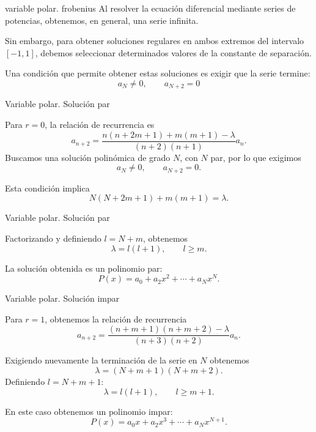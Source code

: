 \begin{frame}{variable polar. frobenius}
    Al resolver la ecuación diferencial mediante series de
    potencias, obtenemos, en general, una serie infinita.

    \vspace{0.2cm}

    Sin embargo, para obtener soluciones regulares en ambos
    extremos del intervalo $[-1,1]$, debemos seleccionar
    determinados valores de la constante de separación.

    \vspace{0.2cm}

    Una condición que permite obtener estas soluciones es
    exigir que la serie termine:
    \[
        a_N\neq 0,\qquad a_{N+2}=0
    \]
\end{frame}

\begin{frame}{Variable polar. Solución par}

    Para $r=0$, la relación de recurrencia es
	\begin{equation}
		a_{n+2}=\frac{n(n+2m+1)+m(m+1)-\lambda}{(n+2)(n+1)}a_n.
		\label{eq:recursividad de P r=0}
	\end{equation}
    Buscamos una solución polinómica de grado $N$, con
    $N$ par, por lo que exigimos
    \[
        a_N\neq 0,\qquad a_{N+2}=0.
    \]

    Esta condición implica
    \[
        N(N+2m+1)+m(m+1)=\lambda.
    \]
\end{frame}

\begin{frame}{Variable polar. Solución par}

    Factorizando y definiendo $l=N+m$, obtenemos
    \[
        \lambda=l(l+1),\qquad l\geq m.
    \]

    La solución obtenida es un polinomio par:
    \[
        P(x)=a_0+a_2x^2+\cdots+a_Nx^N.
    \]

\end{frame}
\begin{frame}{Variable polar. Solución impar}

    Para $r=1$, obtenemos la relación de recurrencia
	\begin{equation}
        a_{n+2}=
        \frac{(n+m+1)(n+m+2)-\lambda}
        {(n+3)(n+2)}a_n.
	\end{equation}

    Exigiendo nuevamente la terminación de la serie en $N$
    obtenemos
    \[
        \lambda=(N+m+1)(N+m+2).
    \]
    Definiendo $l=N+m+1$:
    \[
        \lambda=l(l+1),\qquad l\geq m+1.
    \]

    En este caso obtenemos un polinomio impar:
    \[
        P(x)=a_0x+a_2x^3+\cdots+a_Nx^{N+1}.
    \]

\end{frame}

